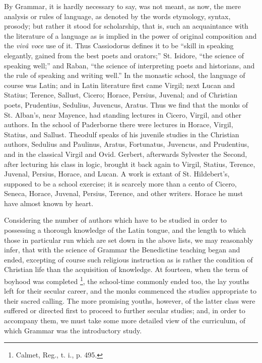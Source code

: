 By Grammar, it is hardly necessary to say, was not meant, as now,
the mere analysis or rules of language, as denoted by the words
etymology, syntax, prosody; but rather it stood for scholarship, that
is, such an acquaintance with the literature of a language as is
implied in the power of original composition and the \emph{vivâ voce}
use of it. Thus Cassiodorus defines it to be ``skill in speaking
elegantly, gained from the best poets and orators;'' St. Isidore,
``the science of speaking well;'' and Raban, ``the science
of interpreting poets and historians, and the rule of speaking and
writing well.'' In the monastic school, the language of course was
Latin; and in Latin literature first came Virgil; next Lucan and
Statius; Terence, Sallust, Cicero; Horace, Persius, Juvenal; and of
Christian poets, Prudentius, Sedulius, Juvencus, Aratus. Thus we find
that the monks of St. Alban's, near Mayence, had standing lectures in
Cicero, Virgil, and other authors. In the school of Paderborne there
were lectures in Horace, Virgil, Statius, and Sallust. Theodulf speaks
of his juvenile studies in the Christian authors, Sedulius and
Paulinus, Aratus, Fortunatus, Juvencus, and Prudentius, and in the
classical Virgil and Ovid. Gerbert, afterwards Sylvester the Second,
after lecturing his class in logic, brought it back again to Virgil,
Statius, Terence, Juvenal, Persius, Horace, and Lucan. A work is
extant of St. Hildebert's, supposed to be a school exercise; it is
scarcely more than a cento of Cicero, Seneca, Horace, Juvenal, Persius,
Terence, and other writers. Horace he must have almost known by heart.

Considering the number of authors which have to be studied in order
to possessing a thorough knowledge of the Latin tongue, and the length
to which those in particular run which are set down in the above
lists, we may reasonably infer, that with the science of Grammar the
Benedictine teaching began and ended, excepting of course such
religious instruction as is rather the condition of Christian life
than the acquisition of knowledge. At fourteen, when the term of
boyhood was completed \footnote{Calmet, Reg.,
t. i., p. 495.},
the school-time commonly ended too, the lay youths left for their
secular career, and the monks commenced the studies appropriate to
their sacred calling. The more promising youths, however, of the
latter class were suffered or directed first to proceed to further
secular studies; and, in order to accompany them, we must take some
more detailed view of the curriculum, of which Grammar was the
introductory study.

